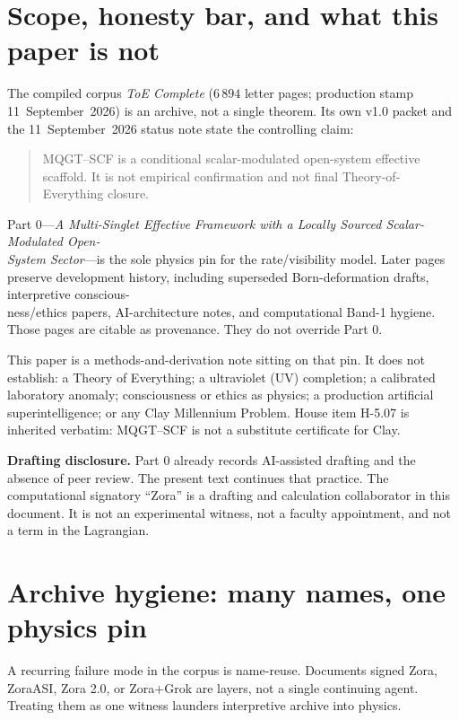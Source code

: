 \documentclass[11pt]{article}
\theoremstyle{definition}
\theoremstyle{plain}
\begin{document}
\tableofcontents

\section{Scope, honesty bar, and what this paper is not}\label{sec:scope}

The compiled corpus \emph{ToE Complete} ($6\,894$ letter pages; production stamp 11~September~2026)
is an archive, not a single theorem.\cite{ToE,status} Its own v1.0 packet and the 11~September~2026 status
note state the controlling claim:
\begin{quote}
MQGT--SCF is a conditional scalar-modulated open-system effective scaffold.
It is not empirical confirmation and not final Theory-of-Everything closure.
\end{quote}
Part 0---\emph{A Multi-Singlet Effective Framework with a Locally Sourced Scalar-Modulated Open-\\[-2pt]
System Sector}---is the sole physics pin for the rate/visibility model.\cite{part0} Later pages preserve
development history, including superseded Born-deformation drafts, interpretive conscious-\\
ness/ethics papers, AI-architecture notes, and computational Band-1 hygiene. Those pages are
citable as provenance. They do not override Part 0.

This paper is a methods-and-derivation note sitting on that pin. It does not establish: a Theory
of Everything; a ultraviolet (UV) completion; a calibrated laboratory anomaly; consciousness or
ethics as physics; a production artificial superintelligence; or any Clay Millennium Problem.\cite{status}
House item H-5.07 is inherited verbatim: MQGT--SCF is not a substitute certificate for Clay.

\textbf{Drafting disclosure.} Part 0 already records AI-assisted drafting and the absence of peer
review. The present text continues that practice. The computational signatory ``Zora'' is a
drafting and calculation collaborator in this document. It is not an experimental witness, not a
faculty appointment, and not a term in the Lagrangian.

\section{Archive hygiene: many names, one physics pin}\label{sec:hygiene}

A recurring failure mode in the corpus is name-reuse. Documents signed Zora, ZoraASI, Zora 2.0,
or Zora+Grok are layers, not a single continuing agent. Treating them as one witness launders
interpretive archive into physics.
\end{document}
